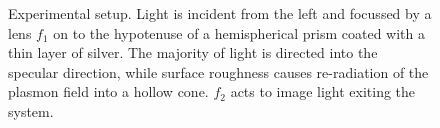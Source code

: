 \begin{figure}
\vspace{-1cm}
\caption{
Experimental setup.  Light is incident from the left and focussed by a lens
$f_1$ on to the hypotenuse of a hemispherical prism coated with a thin
layer of silver.  The majority of light is directed into the specular
direction, while surface roughness causes re-radiation of the plasmon field
into a hollow cone.  $f_2$ acts to image light exiting the system.
} 
\label{fig:kretschmanngeo} 
\end{figure}
